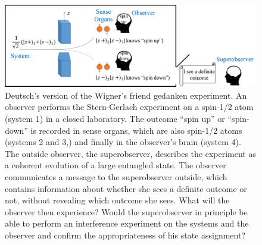 \documentclass[12pt]{article}
\begin{document}
\begin{figure}
\begin{center}
\includegraphics[width=12.4cm]{Slika2.png}
\end{center}
\caption{Deutsch's version of the Wigner's friend gedanken experiment. An observer performs the Stern-Gerlach experiment on a spin-1/2 atom (system 1) in a closed laboratory. The outcome ``spin up'' or ``spin-down'' is recorded in sense organs, which are also spin-1/2 atoms (systems 2 and 3,) and finally in the observer's brain (system 4). The outside observer, the superobserver, describes the experiment as a coherent evolution of a large entangled state. The observer communicates a message to the superobserver outside, which contains information about whether she sees a definite outcome or not, without revealing which outcome she sees. What will the observer then experience? Would the superobserver in principle be able to perform an interference experiment on the systems and the observer and confirm the appropriateness of his state assignment?} \label{figure2}
\end{figure}
\end{document}
